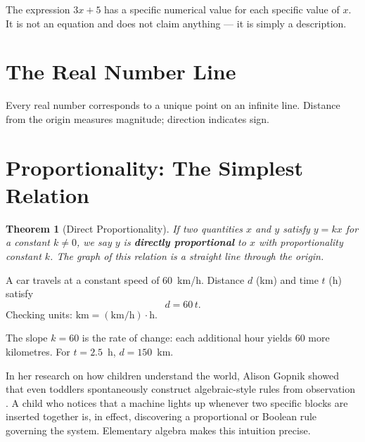 \documentclass[11pt, openany]{book}
\theoremstyle{plain}
\newtheorem{theorem}{Theorem}[chapter]
\theoremstyle{definition}
\theoremstyle{remark}
\newcommand{\R}{\mathbb{R}}
\begin{document}
The expression $3x+5$ has a specific numerical value for each specific value
of $x$. It is not an equation and does not claim anything --- it is simply a
description.

\section{The Real Number Line}

Every real number corresponds to a unique point on an infinite line. Distance
from the origin measures magnitude; direction indicates sign.

\begin{center}
\end{center}

\section{Proportionality: The Simplest Relation}

\begin{theorem}[Direct Proportionality]
If two quantities $x$ and $y$ satisfy $y=kx$ for a constant $k\ne0$, we say
$y$ is \textbf{directly proportional} to $x$ with proportionality constant $k$.
The graph of this relation is a straight line through the origin.
\end{theorem}

\begin{myexample}
A car travels at a constant speed of 60~km/h. Distance $d$ (km) and time $t$
(h) satisfy
\[
  d = 60\,t.
\]
Checking units: $\text{km} = (\text{km/h})\cdot\text{h}$. \checkmark

The slope $k=60$ is the rate of change: each additional hour yields 60 more
kilometres. For $t=2.5$~h, $d=150$~km.
\end{myexample}

\begin{history}
In her research on how children understand the world, Alison Gopnik showed
that even toddlers spontaneously construct algebraic-style rules from
observation \citep{Gopnik2009}. A child who notices that a machine lights up
whenever two specific blocks are inserted together is, in effect, discovering a
proportional or Boolean rule governing the system. Elementary algebra makes
this intuition precise.
\end{history}
\end{document}
